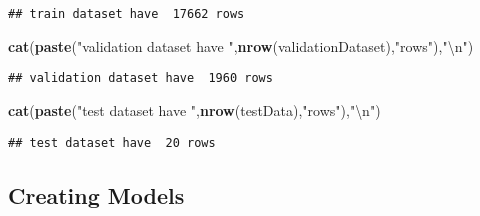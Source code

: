 \documentclass[]{article}
\newenvironment{Shaded}{\begin{snugshade}}{\end{snugshade}}
\newcommand{\KeywordTok}[1]{\textcolor[rgb]{0.13,0.29,0.53}{\textbf{#1}}}
\newcommand{\CharTok}[1]{\textcolor[rgb]{0.31,0.60,0.02}{#1}}
\newcommand{\StringTok}[1]{\textcolor[rgb]{0.31,0.60,0.02}{#1}}
\newcommand{\NormalTok}[1]{#1}
\begin{document}
\begin{verbatim}
## train dataset have  17662 rows
\end{verbatim}

\begin{Shaded}
\begin{Highlighting}[]
\KeywordTok{cat}\NormalTok{(}\KeywordTok{paste}\NormalTok{(}\StringTok{"validation dataset have "}\NormalTok{,}\KeywordTok{nrow}\NormalTok{(validationDataset),}\StringTok{"rows"}\NormalTok{),}\StringTok{"}\CharTok{\textbackslash{}n}\StringTok{"}\NormalTok{)}
\end{Highlighting}
\end{Shaded}

\begin{verbatim}
## validation dataset have  1960 rows
\end{verbatim}

\begin{Shaded}
\begin{Highlighting}[]
\KeywordTok{cat}\NormalTok{(}\KeywordTok{paste}\NormalTok{(}\StringTok{"test dataset have "}\NormalTok{,}\KeywordTok{nrow}\NormalTok{(testData),}\StringTok{"rows"}\NormalTok{),}\StringTok{"}\CharTok{\textbackslash{}n}\StringTok{"}\NormalTok{)}
\end{Highlighting}
\end{Shaded}

\begin{verbatim}
## test dataset have  20 rows
\end{verbatim}

\subsection{Creating Models}\label{creating-models}
\end{document}

